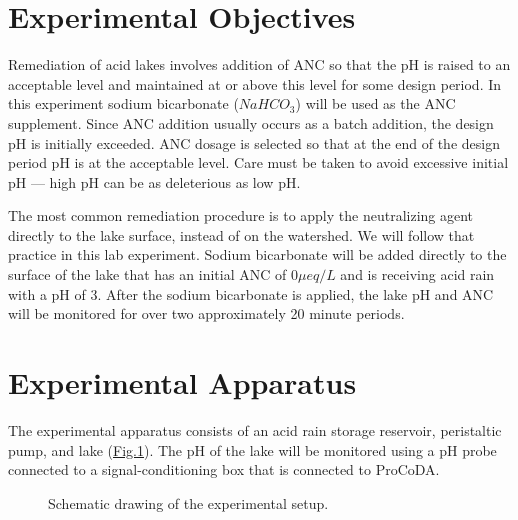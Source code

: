 \documentclass[letterpaper,10pt,english]{sphinxmanual}
\let\sphinxpxdimen\pdfpxdimen\else\newdimen\sphinxpxdimen
\begin{document}
\section{Experimental Objectives}
\label{\detokenize{Acid_Rain/Acid_Rain:experimental-objectives}}\label{\detokenize{Acid_Rain/Acid_Rain:heading-acid-rain-experimental-objectives}}
Remediation of acid lakes involves addition of ANC so that the pH is raised to an acceptable level and maintained at or above this level for some design period. In this experiment sodium bicarbonate (\(NaHCO_3\)) will be used as the ANC supplement. Since ANC addition usually occurs as a batch addition, the design pH is initially exceeded. ANC dosage is selected so that at the end of the design period pH is at the acceptable level. Care must be taken to avoid excessive initial pH — high pH can be as deleterious as low pH.

The most common remediation procedure is to apply the neutralizing agent directly to the lake surface, instead of on the watershed. We will follow that practice in this lab experiment. Sodium bicarbonate will be added directly to the surface of the lake that has an initial ANC of \(0 \mu eq/L\) and is receiving acid rain with a pH of 3. After the sodium bicarbonate is applied, the lake pH and ANC will be monitored for over two approximately 20 minute periods.


\section{Experimental Apparatus}
\label{\detokenize{Acid_Rain/Acid_Rain:experimental-apparatus}}\label{\detokenize{Acid_Rain/Acid_Rain:heading-acid-rain-experimental-apparatus}}
The experimental apparatus consists of an acid rain storage reservoir, peristaltic pump, and lake (\hyperref[\detokenize{Acid_Rain/Acid_Rain:figure-acid-rain-apparatus}]{Fig.\@ \ref{\detokenize{Acid_Rain/Acid_Rain:figure-acid-rain-apparatus}}}). The pH of the lake will be monitored using a pH probe connected to a signal-conditioning box that is connected to ProCoDA.

\begin{figure}[htbp]
\centering
\capstart

\noindent\sphinxincludegraphics[width=500\sphinxpxdimen]{{Acid_rain_apparatus}.png}
\caption{Schematic drawing of the experimental setup.}\label{\detokenize{Acid_Rain/Acid_Rain:id2}}\label{\detokenize{Acid_Rain/Acid_Rain:figure-acid-rain-apparatus}}\end{figure}
\end{document}
